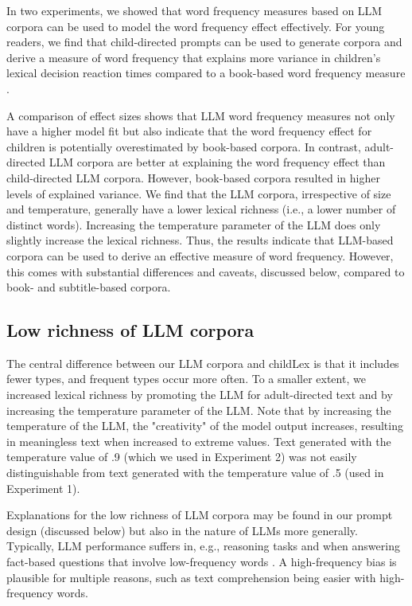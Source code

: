 \documentclass[doc, a4paper]{apa7}
\begin{document}
In two experiments, we showed that word frequency measures based on LLM corpora can be used to model the word frequency effect effectively. For young readers, we find that child-directed prompts can be used to generate corpora and derive a measure of word frequency that explains more variance in children's lexical decision reaction times compared to a book-based word frequency measure \citep[childLex; ][]{schroeder_childlex_2015}. 

A comparison of effect sizes shows that LLM word frequency measures not only have a higher model fit but also indicate that the word frequency effect for children is potentially overestimated by book-based corpora. In contrast, adult-directed LLM corpora are better at explaining the word frequency effect than child-directed LLM corpora. However, book-based corpora resulted in higher levels of explained variance. We find that the LLM corpora, irrespective of size and temperature, generally have a lower lexical richness (i.e., a lower number of distinct words). Increasing the temperature parameter of the LLM does only slightly increase the lexical richness. Thus, the results indicate that LLM-based corpora can be used to derive an effective measure of word frequency. However, this comes with substantial differences and caveats, discussed below, compared to book- and subtitle-based corpora.  


\subsection*{Low richness of LLM corpora}

The central difference between our LLM corpora and childLex is that it includes fewer types, and frequent types occur more often. To a smaller extent, we increased lexical richness by promoting the LLM for adult-directed text and by increasing the temperature parameter of the LLM. Note that by increasing the temperature of the LLM, the "creativity" of the model output increases, resulting in meaningless text when increased to extreme values. Text generated with the temperature value of .9 (which we used in Experiment 2) was not easily distinguishable from text generated with the temperature value of .5 (used in Experiment 1).  

Explanations for the low richness of LLM corpora may be found in our prompt design (discussed below) but also in the nature of LLMs more generally. Typically, LLM performance suffers in, e.g., reasoning tasks \citep{razeghi_impact_2022} and when answering fact-based questions \citep{kandpal_large_2023} that involve low-frequency words \citep{oh_frequency_2024}. A high-frequency bias is plausible for multiple reasons, such as text comprehension being easier with high-frequency words. 
\end{document}
